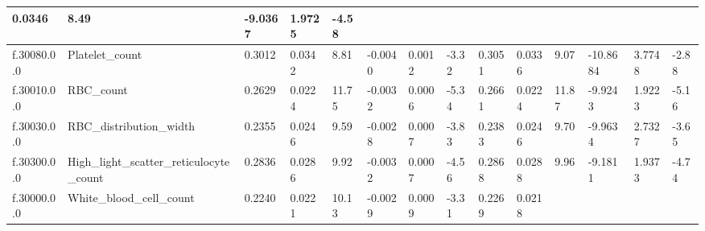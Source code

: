 \begin{longtable}{llllllllllllll}
  \multicolumn{1}{l|}{0.0346} &
  \multicolumn{1}{l|}{8.49} &
  \multicolumn{1}{l|}{-9.0367} &
  \multicolumn{1}{l|}{1.9725} &
  \multicolumn{1}{l|}{-4.58} \\ \hline
\multicolumn{1}{|l|}{f.30080.0.0} &
  \multicolumn{1}{l|}{Platelet\_count} &
  \multicolumn{1}{l|}{0.3012} &
  \multicolumn{1}{l|}{0.0342} &
  \multicolumn{1}{l|}{8.81} &
  \multicolumn{1}{l|}{-0.0040} &
  \multicolumn{1}{l|}{0.0012} &
  \multicolumn{1}{l|}{-3.32} &
  \multicolumn{1}{l|}{0.3051} &
  \multicolumn{1}{l|}{0.0336} &
  \multicolumn{1}{l|}{9.07} &
  \multicolumn{1}{l|}{-10.8684} &
  \multicolumn{1}{l|}{3.7748} &
  \multicolumn{1}{l|}{-2.88} \\ \hline
\multicolumn{1}{|l|}{f.30010.0.0} &
  \multicolumn{1}{l|}{RBC\_count} &
  \multicolumn{1}{l|}{0.2629} &
  \multicolumn{1}{l|}{0.0224} &
  \multicolumn{1}{l|}{11.75} &
  \multicolumn{1}{l|}{-0.0032} &
  \multicolumn{1}{l|}{0.0006} &
  \multicolumn{1}{l|}{-5.34} &
  \multicolumn{1}{l|}{0.2661} &
  \multicolumn{1}{l|}{0.0224} &
  \multicolumn{1}{l|}{11.87} &
  \multicolumn{1}{l|}{-9.9243} &
  \multicolumn{1}{l|}{1.9223} &
  \multicolumn{1}{l|}{-5.16} \\ \hline
\multicolumn{1}{|l|}{f.30030.0.0} &
  \multicolumn{1}{l|}{RBC\_distribution\_width} &
  \multicolumn{1}{l|}{0.2355} &
  \multicolumn{1}{l|}{0.0246} &
  \multicolumn{1}{l|}{9.59} &
  \multicolumn{1}{l|}{-0.0028} &
  \multicolumn{1}{l|}{0.0007} &
  \multicolumn{1}{l|}{-3.83} &
  \multicolumn{1}{l|}{0.2383} &
  \multicolumn{1}{l|}{0.0246} &
  \multicolumn{1}{l|}{9.70} &
  \multicolumn{1}{l|}{-9.9634} &
  \multicolumn{1}{l|}{2.7327} &
  \multicolumn{1}{l|}{-3.65} \\ \hline
\multicolumn{1}{|l|}{f.30300.0.0} &
  \multicolumn{1}{l|}{High\_light\_scatter\_reticulocyte\_count} &
  \multicolumn{1}{l|}{0.2836} &
  \multicolumn{1}{l|}{0.0286} &
  \multicolumn{1}{l|}{9.92} &
  \multicolumn{1}{l|}{-0.0032} &
  \multicolumn{1}{l|}{0.0007} &
  \multicolumn{1}{l|}{-4.56} &
  \multicolumn{1}{l|}{0.2868} &
  \multicolumn{1}{l|}{0.0288} &
  \multicolumn{1}{l|}{9.96} &
  \multicolumn{1}{l|}{-9.1811} &
  \multicolumn{1}{l|}{1.9373} &
  \multicolumn{1}{l|}{-4.74} \\ \hline
\multicolumn{1}{|l|}{f.30000.0.0} &
  \multicolumn{1}{l|}{White\_blood\_cell\_count} &
  \multicolumn{1}{l|}{0.2240} &
  \multicolumn{1}{l|}{0.0221} &
  \multicolumn{1}{l|}{10.13} &
  \multicolumn{1}{l|}{-0.0029} &
  \multicolumn{1}{l|}{0.0009} &
  \multicolumn{1}{l|}{-3.31} &
  \multicolumn{1}{l|}{0.2269} &
  \multicolumn{1}{l|}{0.0218} &

\end{longtable}

